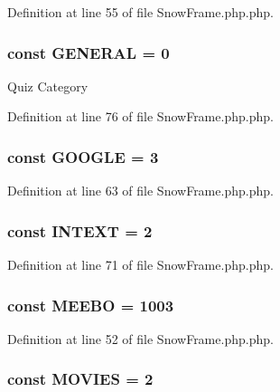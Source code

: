 Definition at line 55 of file SnowFrame.php.php.

\hypertarget{classSnowFrame_ae5543f52532ef1f6a46495bd50779af6}{
\subsubsection[{GENERAL}]{\setlength{\rightskip}{0pt plus 5cm}const {\bf GENERAL} = 0}}
\label{classSnowFrame_ae5543f52532ef1f6a46495bd50779af6}
Quiz Category 

Definition at line 76 of file SnowFrame.php.php.

\hypertarget{classSnowFrame_a2f6a9b703607a1705f94a8eb7027acbe}{
\subsubsection[{GOOGLE}]{\setlength{\rightskip}{0pt plus 5cm}const {\bf GOOGLE} = 3}}
\label{classSnowFrame_a2f6a9b703607a1705f94a8eb7027acbe}


Definition at line 63 of file SnowFrame.php.php.

\hypertarget{classSnowFrame_a60407e5219abaa0cca0dccfa4e4e462d}{
\subsubsection[{INTEXT}]{\setlength{\rightskip}{0pt plus 5cm}const {\bf INTEXT} = 2}}
\label{classSnowFrame_a60407e5219abaa0cca0dccfa4e4e462d}


Definition at line 71 of file SnowFrame.php.php.

\hypertarget{classSnowFrame_ad2ca6d4cc2e4ffb4816e12a42fa6dd09}{
\subsubsection[{MEEBO}]{\setlength{\rightskip}{0pt plus 5cm}const {\bf MEEBO} = 1003}}
\label{classSnowFrame_ad2ca6d4cc2e4ffb4816e12a42fa6dd09}


Definition at line 52 of file SnowFrame.php.php.

\hypertarget{classSnowFrame_a93d4b4a3ec8c210f3bc1c68347a0842d}{
\subsubsection[{MOVIES}]{\setlength{\rightskip}{0pt plus 5cm}const {\bf MOVIES} = 2}}
\label{classSnowFrame_a93d4b4a3ec8c210f3bc1c68347a0842d}


